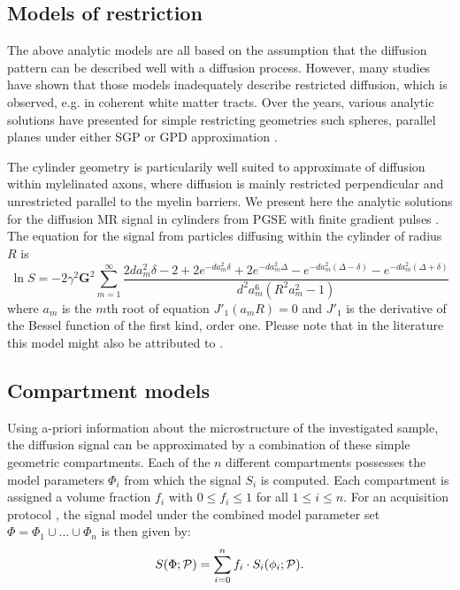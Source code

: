\subsection{Models of restriction}
The above analytic models are all based on the assumption that the diffusion pattern can be described well with a diffusion process. However, many studies have shown that those models inadequately describe restricted diffusion, which is observed, e.g. in coherent white matter tracts. Over the years, various analytic solutions have presented for simple restricting geometries such spheres, parallel planes under either SGP or GPD approximation \citep{Balinov:1993, Linse:1995, Callaghan:1996}.

The cylinder geometry is particularily well suited to approximate of diffusion within mylelinated axons, where diffusion is mainly restricted perpendicular and unrestricted parallel to the myelin barriers. We present here the analytic solutions for the diffusion MR signal in cylinders from PGSE with finite gradient pulses \citep{Stepisnik:1993}. The equation for the signal from particles diffusing within the cylinder of radius $R$ is
\begin{equation}
\ln S = -2\gamma^{2}\textbf{G}^{2}\sum_{m=1}^{\infty}\frac{2da_{m}^{2}\delta-2+2e^{-da_{m}^{2}\delta}+2e^{-da_{m}^{2}\Delta}- e^{-da_{m}^{2}(\Delta-\delta)} -e^{-da_{m}^{2}(\Delta+\delta)}}{d^{2}a_{m}^{6}(R^{2}a_{m}^{2}- 1)}
\label{biganal}
\end{equation}
where  $a_{m}$ is the $m$th root of equation  $J'_{1}(a_{m}R)= 0$ and $J'_{1}$ is the derivative of the Bessel function of the first kind, order one. Please note that in the literature this model might also be attributed to \citet{VanGelderen:1994}.

\subsection{Compartment models}
\label{sec:multicompartment_modeling}
Using a-priori information about the microstructure of the investigated sample, the diffusion signal can be approximated by a combination of these simple geometric compartments. Each of the $n$ different compartments possesses the model parameters $\Phi_{i}$ from which the signal $S_i$ is computed. Each compartment is assigned a volume fraction $f_i$ with $0 \le f_i \le 1$ for all $1 \le i \le n$. For an acquisition protocol \prot{}, the signal model under the combined model parameter set $\Phi=\Phi_{1}\cup\dots\cup\Phi_{n}$ is then given by:
\begin{equation}
	S(\Phi;\mathcal{P})=\sum_{i=0}^{n}f_i\cdot S_i(\phi_i;\mathcal{P}).
\end{equation}

